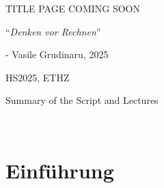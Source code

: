 \documentclass{article}
\begin{document}
\startDocument
\usetcolorboxes
\setcounter{numberingConfig}{3}
\setcounter{numberSubsections}{1}

\vspace{2cm}
\begin{Huge}
    \begin{center}
        TITLE PAGE COMING SOON
    \end{center}
\end{Huge}


\vspace{4cm}
\begin{center}
    \begin{Large}
        ``\textit{Denken vor Rechnen}''
    \end{Large}

    \hspace{3cm} - Vasile Grudinaru, 2025
\end{center}

\vspace{3cm}
\begin{center}
    HS2025, ETHZ\\[0.2cm]
    \begin{Large}
        Summary of the Script and Lectures
    \end{Large}\\[0.2cm]
\end{center}



\newpage
{}



\newsection
\section{Einführung}







\end{document}
